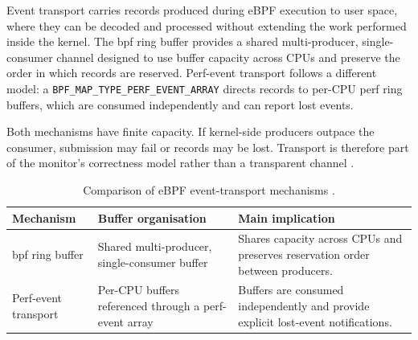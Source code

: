Event transport carries records produced during eBPF execution to user space,
where they can be decoded and processed without extending the work performed
inside the kernel. The \gls{bpf} ring buffer provides a shared
multi-producer, single-consumer channel designed to use buffer capacity across
CPUs and preserve the order in which records are reserved. Perf-event
transport follows a different model: a
\texttt{BPF\_MAP\_TYPE\_PERF\_EVENT\_ARRAY} directs records to per-CPU perf
ring buffers, which are consumed independently and can report lost events.

Both mechanisms have finite capacity. If kernel-side producers outpace the
consumer, submission may fail or records may be lost. Transport is therefore
part of the monitor's correctness model rather than a transparent channel
\cite{linux_bpf_ringbuf,linux_perf_ring_buffer,linux_bpf_helpers}.

\begin{table}[H]
    \centering
    \small
    \renewcommand{\arraystretch}{1.15}

    \label{tab:ebpf-event-transport}

    \begin{tabularx}{\textwidth}{
        @{}
        >{\raggedright\arraybackslash}p{}
        >{\raggedright\arraybackslash}p{}
        >{\raggedright\arraybackslash}X
        @{}
    }
        \toprule
        \textbf{Mechanism} &
        \textbf{Buffer organisation} &
        \textbf{Main implication} \\
        \midrule

        \gls{bpf} ring buffer &
        Shared multi-producer, single-consumer buffer &
        Shares capacity across CPUs and preserves reservation order between
        producers. \\

        Perf-event transport &
        Per-CPU buffers referenced through a perf-event array &
        Buffers are consumed independently and provide explicit lost-event
        notifications. \\

        \bottomrule
    \end{tabularx}

    \caption[Comparison of eBPF event-transport mechanisms]
    {Comparison of eBPF event-transport mechanisms
    \cite{linux_bpf_ringbuf,linux_perf_ring_buffer}.}

\end{table}

